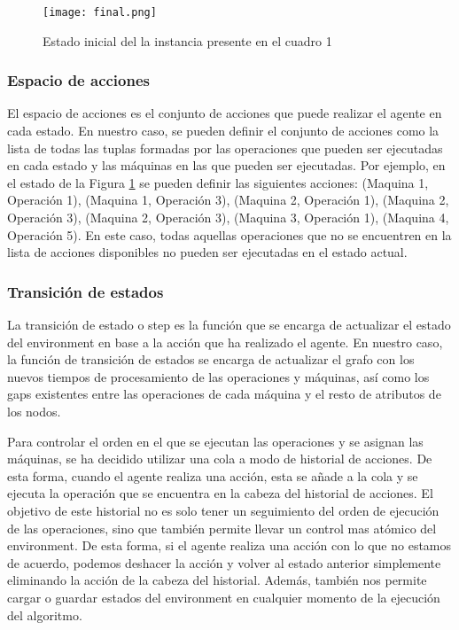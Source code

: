 \begin{figure}[ht]
    \centering
    \texttt{[image: final.png]}
    \caption{Estado inicial del la instancia presente en el cuadro 1}
    \label{fig:final-solution}
\end{figure}

\subsubsection{Espacio de acciones}
El espacio de acciones es el conjunto de acciones que puede realizar el agente en cada estado. 
En nuestro caso, se pueden definir el conjunto de acciones como la lista de todas las tuplas 
formadas por las operaciones que pueden ser ejecutadas en cada estado y las máquinas en las que
pueden ser ejecutadas. Por ejemplo, en el estado de la Figura \ref{fig:final-solution} se pueden
definir las siguientes acciones: (Maquina 1, Operación 1), (Maquina 1, Operación 3), 
(Maquina 2, Operación 1), (Maquina 2, Operación 3), (Maquina 2, Operación 3), (Maquina 3, Operación 1), 
(Maquina 4, Operación 5). En este caso, todas aquellas operaciones que no se encuentren en la lista 
de acciones disponibles no pueden ser ejecutadas en el estado actual.

\subsubsection{Transición de estados}
La transición de estado o step es la función que se encarga de actualizar el estado del environment
en base a la acción que ha realizado el agente. En nuestro caso, la función de transición de estados
se encarga de actualizar el grafo con los nuevos tiempos de procesamiento de las operaciones y máquinas, 
así como los gaps existentes entre las operaciones de cada máquina y el resto de atributos de los nodos.\medskip

Para controlar el orden en el que se ejecutan las operaciones y se asignan las máquinas, se ha
decidido utilizar una cola a modo de historial de acciones. De esta forma, cuando el agente realiza
una acción, esta se añade a la cola y se ejecuta la operación que se encuentra en la cabeza del historial
de acciones. El objetivo de este historial no es solo tener un seguimiento del orden de ejecución de las operaciones, sino
que también permite llevar un control mas atómico del environment. De esta forma, si el agente realiza
una acción con lo que no estamos de acuerdo, podemos deshacer la acción y volver al estado anterior
simplemente eliminando la acción de la cabeza del historial. Además, también nos permite cargar o guardar
estados del environment en cualquier momento de la ejecución del algoritmo.\medskip

